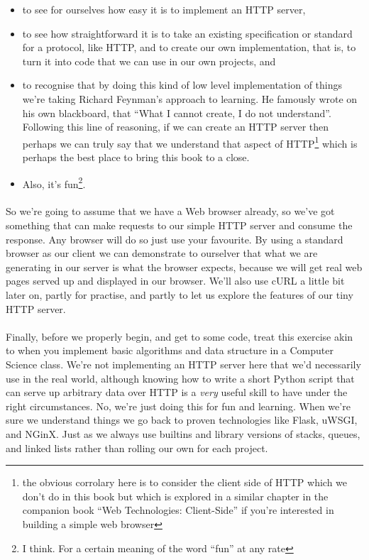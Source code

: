 \begin{itemize}
\item to see for ourselves how easy it is to implement an HTTP server,
\item to see how straightforward it is to take an existing specification or standard for a protocol, like HTTP, and to create our own implementation, that is, to turn it into code that we can use in our own projects, and
\item to recognise that by doing this kind of low level implementation of things we're taking Richard Feynman's approach to learning. He famously wrote on his own blackboard, that ``What I cannot create, I do not understand''. Following this line of reasoning, if we can create an HTTP server then perhaps we can truly say that we understand that aspect of HTTP\footnote{the obvious corrolary here is to consider the client side of HTTP which we don't do in this book but which is explored in a similar chapter in the companion book ``Web Technologies: Client-Side'' if you're interested in building a simple web browser} which is perhaps the best place to bring this book to a close.
\item Also, it's fun\footnote{I think. For a certain meaning of the word ``fun'' at any rate}.
\end{itemize}

\paragraph{} So we're going to assume that we have a Web browser already, so we've got something that can make requests to our simple HTTP server and consume the response. Any browser will do so just use your favourite. By using a standard browser as our client we can demonstrate to ourselver that what we are generating in our server is what the browser expects, because we will get real web pages served up and displayed in our browser. We'll also use cURL a little bit later on, partly for practise, and partly to let us explore the features of our tiny HTTP server.

\paragraph{} Finally, before we properly begin, and get to some code, treat this exercise akin to when you implement basic algorithms and data structure in a Computer Science class. We're not implementing an HTTP server here that we'd necessarily use in the real world, although knowing how to write a short Python script that can serve up arbitrary data over HTTP is a \emph{very} useful skill to have under the right circumstances. No, we're just doing this for fun and learning. When we're sure we understand things we go back to proven technologies like Flask, uWSGI, and NGinX. Just as we always use builtins and library versions of stacks, queues, and linked lists rather than rolling our own for each project.

